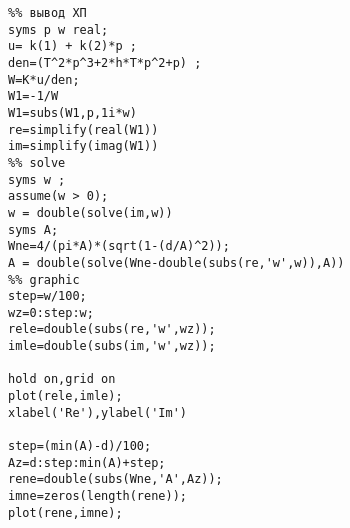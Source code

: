 \begin{verbatim}
%% вывод ХП 
syms p w real;
u= k(1) + k(2)*p ;
den=(T^2*p^3+2*h*T*p^2+p) ;
W=K*u/den;
W1=-1/W
W1=subs(W1,p,1i*w)
re=simplify(real(W1))
im=simplify(imag(W1))
%% solve
syms w ;
assume(w > 0);
w = double(solve(im,w))
syms A;
Wne=4/(pi*A)*(sqrt(1-(d/A)^2));
A = double(solve(Wne-double(subs(re,'w',w)),A))
%% graphic
step=w/100;
wz=0:step:w;
rele=double(subs(re,'w',wz));
imle=double(subs(im,'w',wz));

hold on,grid on
plot(rele,imle);
xlabel('Re'),ylabel('Im')

step=(min(A)-d)/100;
Az=d:step:min(A)+step;
rene=double(subs(Wne,'A',Az));
imne=zeros(length(rene));
plot(rene,imne);
\end{verbatim}